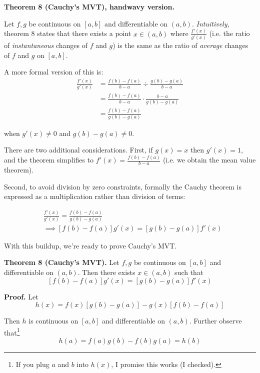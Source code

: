 \textbf{Theorem 8 (Cauchy's MVT), handwavy version.}

\vs

Let $f,g$ be continuous on $[a,b]$ and differentiable on $(a,b)$.
\textit{Intuitively,} theorem 8 states that there exists a point
$x\in(a,b)$ where $\frac{f'(x)}{g'(x)}$ (i.e. the ratio of
\textit{instantaneous} changes of $f$ and $g$) is the same as the
ratio of \textit{average} changes of $f$ and $g$ on $[a,b]$.

\vs

A more formal version of this is:
\begin{align*}
  \frac{f'(x)}{g'(x)}&=\frac{f(b)-f(a)}{b-a}\div \frac{g(b)-g(a)}{b-a}\\
                     &=\frac{f(b)-f(a)}{b-a}\cdot \frac{b-a}{g(b)-g(a)}\\
                     &=\frac{f(b)-f(a)}{g(b)-g(a)}
\end{align*}

when $g'(x)\neq 0$ and $g(b)-g(a)\neq0$.

\vs

There are two additional considerations. First, if $g(x)=x$ then
$g'(x)=1$, and the theorem simplifies to $f'(x)=\frac{f(b)-f(a)}{b-a}$
(i.e. we obtain the mean value theorem).

\vs

Second, to avoid division by zero constraints, formally the Cauchy
theorem is expressed as a multiplication rather than division of
terms:

\begin{align*}
  &\frac{f'(x)}{g'(x)}=\frac{f(b)-f(a)}{g(b)-g(a)}\\
  &\implies [f(b)-f(a)]g'(x)=[g(b)-g(a)]f'(x)
\end{align*}

With this buildup, we're ready to prove Cauchy's MVT.

\vs

\textbf{Theorem 8 (Cauchy's MVT).} Let $f,g$ be continuous on $[a,b]$
and differentiable on $(a,b)$. Then there exists $x\in(a,b)$ such that
\[[f(b)-f(a)]g'(x)=[g(b)-g(a)]f'(x)\]

\vs

\textbf{Proof.} Let
\[h(x)=f(x)[g(b)-g(a)]-g(x)[f(b)-f(a)]\]

Then $h$ is continuous on $[a,b]$ and differentiable on $(a,b)$.
Further observe that\footnote{If you plug $a$ and $b$ into $h(x)$, I
  promise this works (I checked).}
\[h(a)=f(a)g(b)-f(b)g(a)=h(b)\]


